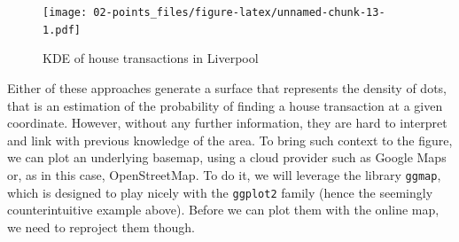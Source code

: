 \documentclass[]{book}
\newenvironment{Shaded}{\begin{snugshade}}{\end{snugshade}}
\newcommand{\CommentTok}[1]{\textcolor[rgb]{0.56,0.35,0.01}{\textit{#1}}}
\newcommand{\DataTypeTok}[1]{\textcolor[rgb]{0.13,0.29,0.53}{#1}}
\newcommand{\DecValTok}[1]{\textcolor[rgb]{0.00,0.00,0.81}{#1}}
\newcommand{\KeywordTok}[1]{\textcolor[rgb]{0.13,0.29,0.53}{\textbf{#1}}}
\newcommand{\NormalTok}[1]{#1}
\newcommand{\OperatorTok}[1]{\textcolor[rgb]{0.81,0.36,0.00}{\textbf{#1}}}
\newcommand{\StringTok}[1]{\textcolor[rgb]{0.31,0.60,0.02}{#1}}
\begin{document}
\begin{figure}
\centering
\texttt{[image: 02-points\_files/figure-latex/unnamed-chunk-13-1.pdf]}
\caption{\label{fig:unnamed-chunk-13}KDE of house transactions in Liverpool}
\end{figure}

Either of these approaches generate a surface that represents the density of dots, that is an estimation of the probability of finding a house transaction at a given coordinate. However, without any further information, they are hard to interpret and link with previous knowledge of the area. To bring such context to the figure, we can plot an underlying basemap, using a cloud provider such as Google Maps or, as in this case, OpenStreetMap. To do it, we will leverage the library \texttt{ggmap}, which is designed to play nicely with the \texttt{ggplot2} family (hence the seemingly counterintuitive example above). Before we can plot them with the online map, we need to reproject them though.

\begin{Shaded}
\end{Shaded}
\end{document}
